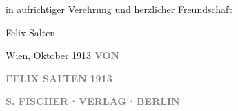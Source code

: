 \pstart
           \raggedleft{}in aufrichtiger Verehrung und herzlicher Freundschaft\pend
           
\pstart
           \raggedleft{}Felix Salten\pend
           
\pstart
           \raggedleft{}Wien, Oktober 1913\pend
           {\vspace{1\baselineskip}}
\pstart
           \centering{}\textcolor{gray}{\textbf{VON}}\pend
           
\pstart
           \centering{}\textcolor{gray}{\textbf{FELIX SALTEN}}\pend
           {\vspace{1\baselineskip}}
\pstart
           \centering{}\textcolor{gray}{\textbf{1913}}\pend
           
\pstart
           \centering{}\textcolor{gray}{\textbf{S. FISCHER ⋅ VERLAG ⋅ BERLIN}}\pend
           \endnumbering{}
\begin{anhang}
\end{anhang}\newcommand{\dateiname}{L03988}\newcommand{\titel}{Felix Salten: Widmungsexemplar von Gestalten und Erscheinungen an Olga Schnitzler, Oktober 1913}\newcommand{\editorInnen}{Selma Jahnke und Martin Anton Müller}

